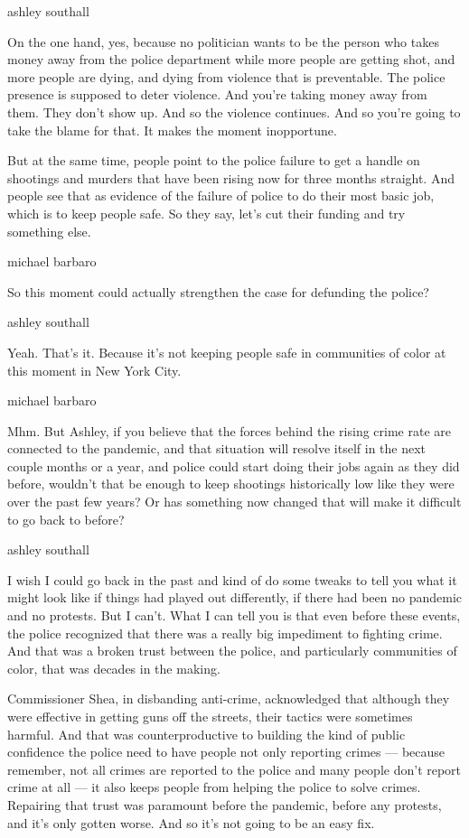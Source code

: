 ashley southall

On the one hand, yes, because no politician wants to be the person who
takes money away from the police department while more people are
getting shot, and more people are dying, and dying from violence that is
preventable. The police presence is supposed to deter violence. And
you're taking money away from them. They don't show up. And so the
violence continues. And so you're going to take the blame for that. It
makes the moment inopportune.

But at the same time, people point to the police failure to get a handle
on shootings and murders that have been rising now for three months
straight. And people see that as evidence of the failure of police to do
their most basic job, which is to keep people safe. So they say, let's
cut their funding and try something else.

michael barbaro

So this moment could actually strengthen the case for defunding the
police?

ashley southall

Yeah. That's it. Because it's not keeping people safe in communities of
color at this moment in New York City.

michael barbaro

Mhm. But Ashley, if you believe that the forces behind the rising crime
rate are connected to the pandemic, and that situation will resolve
itself in the next couple months or a year, and police could start doing
their jobs again as they did before, wouldn't that be enough to keep
shootings historically low like they were over the past few years? Or
has something now changed that will make it difficult to go back to
before?

ashley southall

I wish I could go back in the past and kind of do some tweaks to tell
you what it might look like if things had played out differently, if
there had been no pandemic and no protests. But I can't. What I can tell
you is that even before these events, the police recognized that there
was a really big impediment to fighting crime. And that was a broken
trust between the police, and particularly communities of color, that
was decades in the making.

Commissioner Shea, in disbanding anti-crime, acknowledged that although
they were effective in getting guns off the streets, their tactics were
sometimes harmful. And that was counterproductive to building the kind
of public confidence the police need to have people not only reporting
crimes --- because remember, not all crimes are reported to the police
and many people don't report crime at all --- it also keeps people from
helping the police to solve crimes. Repairing that trust was paramount
before the pandemic, before any protests, and it's only gotten worse.
And so it's not going to be an easy fix.

